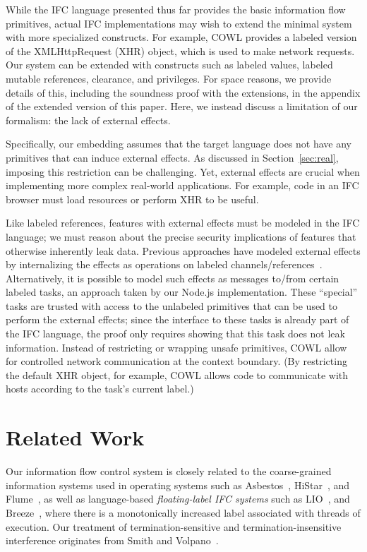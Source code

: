 \documentclass{llncs}
\newif\ifextended
\newcommand{\appendixextfirst}{\ifextended Appendix~\ref{sec:appendix-extensions}\else the appendix of the extended version of this paper\fi }
\begin{document}
While the IFC language presented thus far provides the basic
information flow primitives, actual IFC implementations
may wish to extend the minimal system with more specialized
constructs.
For example, COWL provides a labeled version of the XMLHttpRequest (XHR) object,
which is used to make network requests.
Our system can be extended with constructs such as labeled values,
labeled mutable references, clearance, and privileges.
For space reasons, we provide
details of this, including the soundness
proof with the extensions, in \appendixextfirst{}.
Here, we instead discuss a limitation of our formalism: the lack of
external effects.


Specifically, our embedding assumes that the target language does not
have any primitives that can induce external effects.
As discussed in Section~\ref{sec:real}, imposing this restriction
can be challenging.
Yet, external effects are crucial when implementing more complex
real-world applications.
For example, code in an IFC browser must load resources or
perform XHR to be useful.

Like labeled references, features with external effects must be
modeled in the IFC language; we must reason about the precise security
implications of features that otherwise inherently leak data.
Previous approaches have modeled external effects by internalizing the
effects as operations on labeled channels/references~\cite{stefan:addressing-covert}.
Alternatively, it is possible to model such effects as messages to/from
certain labeled tasks, an approach taken by our Node.js
implementation.
These ``special'' tasks are trusted with access to the unlabeled
primitives that can be used to perform the external effects; since the
interface to these tasks is already part of the IFC language, the
proof only requires showing that this task does not leak information.
Instead of restricting or wrapping unsafe primitives,
COWL allow for
controlled network communication at the context boundary.
(By restricting the default XHR object, for example, COWL allows code
to communicate with hosts according to the task's current label.)
\section{Related Work}
\label{sec:related}





Our information flow control system is closely related
to the coarse-grained information systems used in operating systems such
as Asbestos~\cite{efstathopoulos:asbestos},
HiStar~\cite{Zeldovich:2006}, and Flume~\cite{krohn:flume}, as well as language-based
\emph{floating-label IFC systems} such as LIO~\cite{lio},
and Breeze~\cite{Hritcu:2013:YIB:2497621.2498098}, where there is a
monotonically increased label
associated with threads of execution.
Our treatment of termination-sensitive and termination-insensitive interference
originates from Smith and Volpano~\cite{Smith:Volpano:MultiThreaded,Volpano:1997:ECF:794197.795081}.
\end{document}
